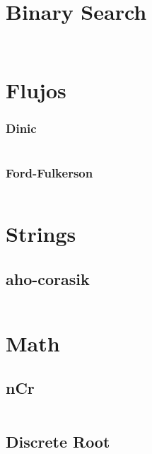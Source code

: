 \documentclass[11pt]{article}
\begin{document}
			\section{Binary Search}
				\inputminted[tabsize=2,breaklines,fontsize=\small]{c++}{algorithms/binarySearch.cpp}
				\inputminted[tabsize=2,breaklines,fontsize=\small]{c++}{algorithms/ternarySearch.cpp}
			\section{Flujos}
				\subsubsection{Dinic}
					\inputminted[tabsize=2,breaklines,fontsize=\small]{c++}{Flows/Dinic.cpp}
				\subsubsection{Ford-Fulkerson}
					\inputminted[tabsize=2,breaklines,fontsize=\small]{c++}{Flows/Ford-Fulkerson.cpp}
			\section{Strings}
				\subsection{aho-corasik}
					\inputminted[tabsize=2,breaklines,fontsize=\small]{c++}{Strings/Aho-corasik.cpp}
			\section{Math}
				\subsection{nCr}
					\inputminted[tabsize=2,breaklines,fontsize=\small]{c++}{Math/nCr.cpp}
				\subsection{Discrete Root}
					\inputminted[tabsize=2,breaklines,fontsize=\small]{c++}{Math/discreteRoot.cpp}
					
			
		
		
	
\end{document}
